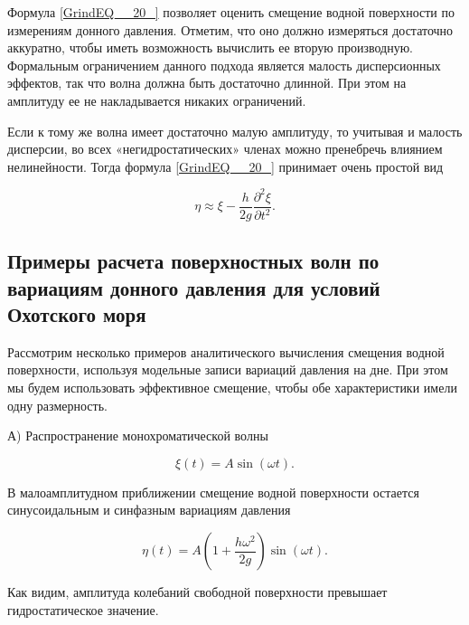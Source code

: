 Формула \eqref{GrindEQ__20_} позволяет оценить смещение водной поверхности по измерениям донного давления. Отметим, что оно должно измеряться достаточно аккуратно, чтобы иметь возможность вычислить ее вторую производную. Формальным ограничением данного подхода является малость дисперсионных эффектов, так что волна должна быть достаточно длинной. При этом на амплитуду ее не накладывается никаких ограничений.

Если к тому же волна имеет достаточно малую амплитуду, то учитывая и малость дисперсии, во всех «негидростатических» членах можно пренебречь влиянием нелинейности. Тогда формула \eqref{GrindEQ__20_} принимает очень простой вид


\begin{equation} \label{GrindEQ__21_}
\eta \approx \xi -\frac{h}{2g} \frac{\partial ^{2} \xi }{\partial t^{2} } .
\end{equation}

\subsection{Примеры расчета поверхностных волн по вариациям донного давления для условий Охотского моря}

Рассмотрим несколько примеров аналитического вычисления смещения водной поверхности, используя модельные записи вариаций давления на дне. При этом мы будем использовать эффективное смещение, чтобы обе характеристики имели одну размерность.

А) Распространение монохроматической волны


\begin{equation} \label{GrindEQ__22_}
\xi (t)=A\sin (\omega t).
\end{equation}


В малоамплитудном приближении смещение водной поверхности остается синусоидальным и синфазным вариациям давления

\begin{equation} \label{GrindEQ__23_}
\eta(t)=A\left(1+\frac{h\omega^{2} }{2g} \right)\sin(\omega t).
\end{equation}


Как видим, амплитуда колебаний свободной поверхности превышает гидростатическое значение.

